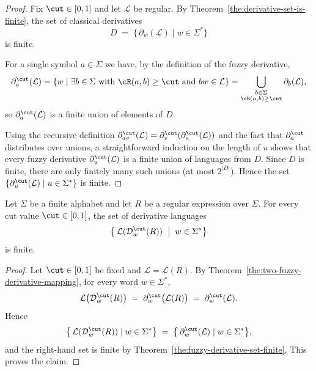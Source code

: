 \begin{proof}
Fix $\cut \in [0,1]$ and let $\mathcal{L}$ be regular. By
Theorem~\ref{the:derivative-set-is-finite}, the set of classical derivatives
\[
  D \;=\; \bigl\{\, \partial_w(\mathcal{L}) \mid w \in \Sigma^* \bigr\}
\]
is finite.

For a single symbol $a \in \Sigma$ we have, by the definition of the fuzzy
derivative,
\[
  \partial_a^\cut(\mathcal{L})
  = \{ w \mid \exists b \in \Sigma \text{ with } \cR(a,b) \ge \cut
                  \text{ and } bw \in \mathcal{L} \}
  = \bigcup_{\substack{b \in \Sigma \\ \cR(a,b) \ge \cut}} \partial_b(\mathcal{L}),
\]
so $\partial_a^\cut(\mathcal{L})$ is a finite union of elements of $D$.

Using the recursive definition
$\partial_{av}^\cut(\mathcal{L}) = \partial_v^\cut(\partial_a^\cut(\mathcal{L}))$
and the fact that $\partial_a^\cut$ distributes over unions, a straightforward
induction on the length of $u$ shows that every fuzzy derivative
$\partial_u^\cut(\mathcal{L})$ is a finite union of languages from $D$.
Since $D$ is finite, there are only finitely many such unions (at most
$2^{|D|}$). Hence the set
$\{\partial_u^\cut(\mathcal{L}) \mid u \in \Sigma^*\}$ is finite.
\end{proof}



\begin{theorem}\label{the:regex-fuzzy-derivative-types-finite}
Let $\Sigma$ be a finite alphabet and let $R$ be a regular expression over
$\Sigma$. For every cut value $\cut \in [0,1]$, the set of derivative languages
\[
  \bigl\{\, \mathcal{L}(\mathcal{D}^\cut_{w}(R)) \;\bigm|\; w \in \Sigma^* \bigr\}
\]
is finite.
\end{theorem}

\begin{proof}
Let $\cut \in [0,1]$ be fixed and $\mathcal{L} = \mathcal{L}(R)$.
By Theorem~\ref{the:two-fuzzy-derivative-mapping}, for every word $w \in \Sigma^*$,
\[
  \mathcal{L}\bigl(\mathcal{D}^\cut_w(R)\bigr)
  \;=\;
  \partial^\cut_w\bigl(\mathcal{L}(R)\bigr)
  \;=\;
  \partial^\cut_w(\mathcal{L}).
\]
Hence
\[
  \bigl\{\, \mathcal{L}(\mathcal{D}^\cut_{w}(R)) \mid w \in \Sigma^* \bigr\}
  \;=\;
  \bigl\{\, \partial^\cut_w(\mathcal{L}) \mid w \in \Sigma^* \bigr\},
\]
and the right-hand set is finite by
Theorem~\ref{the:fuzzy-derivative-set-finite}. This proves the claim.
\end{proof}



